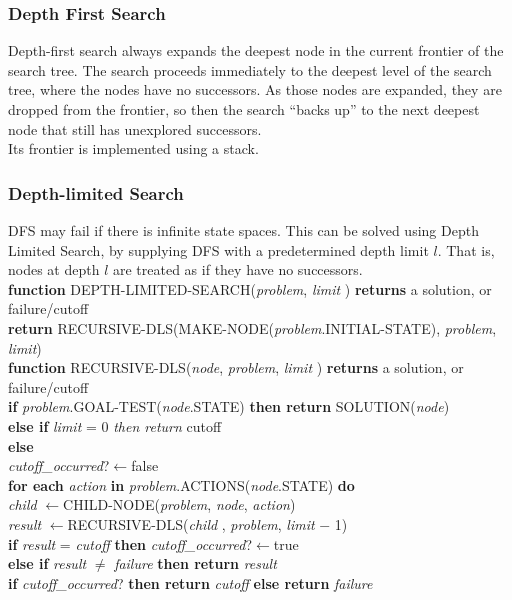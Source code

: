 \documentclass[12pt]{article}
\newcommand{\ind}{\hspace*{15pt}}
\theoremstyle{definition}
\begin{document}
\subsubsection{Depth First Search}
Depth-first search always expands the deepest node in the current frontier of the search tree. The search proceeds immediately to the deepest level of the search tree, where the nodes have no successors. As those nodes are expanded, they are dropped from the frontier, so then the search “backs up” to the next deepest node that still has unexplored successors.\\
Its frontier is implemented using a stack.\\
\subsubsection{Depth-limited Search}
DFS may fail if there is infinite state spaces. This can be solved using Depth Limited Search, by supplying DFS with a predetermined depth limit $l$. That is, nodes at depth $l$ are treated as if they have no successors.\\
\textbf{function} \textsc{DEPTH-LIMITED-SEARCH}(\textit{problem}, \textit{limit} ) \textbf{returns} a solution, or failure/cutoff\\
\ind \textbf{return} \textsc{RECURSIVE-DLS}(\textsc{MAKE-NODE}(\textit{problem}.\textsc{INITIAL-STATE}), \textit{problem}, \textit{limit})\\

\textbf{function} \textsc{RECURSIVE-DLS}(\textit{node}, \textit{problem}, \textit{limit} ) \textbf{returns} a solution, or failure/cutoff\\
\ind \textbf{if} \textit{problem}.\textsc{GOAL-TEST}(\textit{node}.\textsc{STATE)} \textbf{then return} \textsc{SOLUTION}(\textit{node})\\
\ind \textbf{else if} \textit{limit} = 0 \textit{then return} cutoff\\
\ind \textbf{else}\\
\ind \ind \textit{cutoff\_occurred}?$\leftarrow$false\\
\ind \ind \textbf{for each} \textit{action} \textbf{in} \textit{problem}.\textsc{ACTIONS}(\textit{node}.\textsc{STATE}) \textbf{do}\\
\ind \ind \ind \textit{child} $\leftarrow$\textsc{CHILD-NODE}(\textit{problem}, \textit{node}, \textit{action})\\
\ind \ind \ind \textit{result} $\leftarrow$\textsc{RECURSIVE-DLS}(\textit{child} , \textit{problem}, \textit{limit} $-$ 1)\\
\ind \ind \ind \textbf{if} \textit{result} = \textit{cutoff} \textbf{then} \textit{cutoff\_occurred}?$\leftarrow$true\\
\ind \ind \ind \textbf{else if} \textit{result} $\neq$ \textit{failure} \textbf{then return} \textit{result}\\
\ind \ind \textbf{if} \textit{cutoff\_occurred}? \textbf{then return} \textit{cutoff} \textbf{else return} \textit{failure}\\
\end{document}
